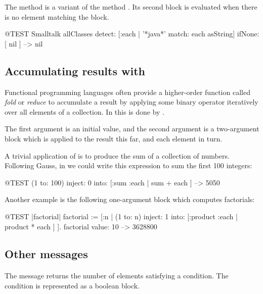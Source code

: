 \documentclass[a4paper,10pt,twoside]{book}
\begin{document}

The method  is a variant of the method . Its second block is evaluated
when there is no element matching the block.

\begin{code}{@TEST}
Smalltalk allClasses detect: [:each | '*java*' match: each asString] ifNone: [ nil ] --> nil
\end{code}

\subsection{Accumulating results with }
Functional programming languages often provide a higher-order function called \emph{fold} or \emph{reduce} to accumulate a result by applying some binary operator iteratively over all elements of a collection.
In \squeak this is done by .

The first argument is an initial value, and the second argument is a two-argument block which is applied to the result this far, and each element in turn.

A trivial application of  is to produce the sum of a collection of numbers.
Following Gauss, in \squeak we could write this expression to sum the first 100 integers:
\begin{code}{@TEST}
(1 to: 100) inject: 0 into: [:sum :each | sum + each ] --> 5050
\end{code}

Another example is the following one-argument block which computes factorials:
\begin{code}{@TEST |factorial|}
factorial := [:n | (1 to: n) inject: 1 into: [:product :each | product * each ] ].
factorial value: 10 --> 3628800
\end{code}

\subsection{Other messages}

\paragraph{} The message  returns the number of elements satisfying a condition.  The condition is represented as a boolean block.
\end{document}
